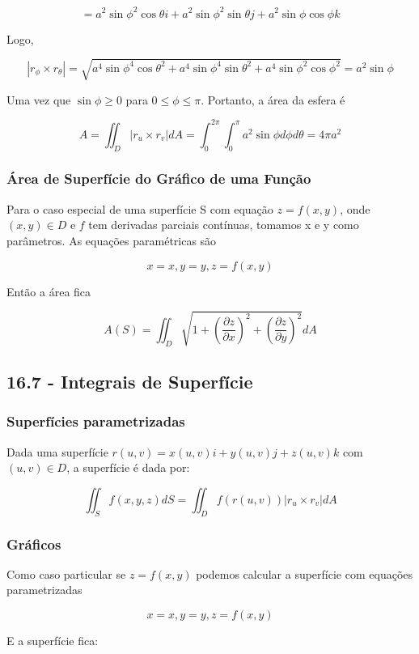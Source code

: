 \documentclass[12pt]{article}
\begin{document}
$$ = a^2 \sin{\phi}^2 \cos{\theta}i + a^2 \sin{\phi}^2 \sin{\theta}j + a^2 \sin{\phi} \cos{\phi}k$$

Logo,

$$|r_\phi \times r_\theta| = \sqrt{a^4 \sin{\phi}^4 \cos{\theta}^2 + a^4 \sin{\phi}^4 \sin{\theta}^2 + a^4 \sin{\phi}^2 \cos{\phi}^2} = a^2 \sin{\phi}$$

Uma vez que $\sin{\phi} \geq 0$ para $0 \leq \phi \leq \pi$. Portanto, a área da esfera é

$$A = \iint_D |r_u \times r_v| dA = \int_0 ^{2 \pi} \int_0 ^\pi a^2 \sin{\phi} d \phi d \theta = 4 \pi a^2$$

\subsubsection*{Área de Superfície do Gráfico de uma Função}

Para o caso especial de uma superfície S com equação $z = f(x, y)$, onde $(x, y) \in D$ e $f$
tem derivadas parciais contínuas, tomamos x e y como parâmetros. As equações paramétricas são

$$x = x, y = y, z = f(x, y)$$

Então a área fica

$$A(S) = \iint_D \sqrt{1 + \left(\frac{\partial z}{\partial x}\right)^2 + \left(\frac{\partial z}{\partial y}\right)^2} dA$$

\subsection*{16.7 - Integrais de Superfície}
\subsubsection*{Superfícies parametrizadas}

Dada uma superfície $r(u, v) = x(u, v)i + y(u, v)j + z(u, v)k$ com $(u, v) \in D$, a superfície é dada por:

$$\iint_S f(x, y, z) dS = \iint_D f(r(u, v)) |r_u \times r_v| dA$$

\subsubsection*{Gráficos}
Como caso particular se $z = f(x, y)$ podemos calcular a superfície com equações parametrizadas

$$x = x, y = y, z = f(x, y)$$

E a superfície fica:
\end{document}
